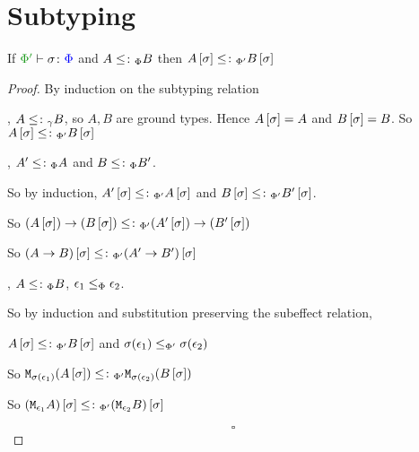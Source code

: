 \documentclass{report}
\begin{document}
\section{Subtyping}

\begin{theorem} 
    If $\typerelation{\P'}{\si}{\P}$ and $A\leq\colon_\Phi B$ then $A\left[\sigma\right]\leq\colon_{\Phi'} B\left[\sigma\right]$    
\end{theorem}
\begin{framed}
    \begin{proof}
        By induction on the subtyping relation
        
        \bi, $A\leq\colon_\gamma B$, so $A, B$ are ground types.
        Hence $A\left[\sigma\right] = A$ and $B\left[\sigma\right] = B$.
        So $A\left[\sigma\right]\leq\colon_{\Phi'} B\left[\sigma\right]$
        
        \bi, $A'\leq\colon_\Phi A$ and $B\leq\colon_\Phi B'$.
        
        So by induction, $A'\left[\sigma\right]\leq\colon_{\Phi'} A\left[\sigma\right]$ and $B\left[\sigma\right]\leq\colon_{\Phi'} B'\left[\sigma\right]$.
        
        So $(A\left[\sigma\right])\rightarrow (B\left[\sigma\right])\leq\colon_{\Phi'} (A'\left[\sigma\right])\rightarrow (B'\left[\sigma\right])$
        
        So $(A\rightarrow B)\left[\sigma\right]\leq\colon_{\Phi'} (A'\rightarrow B')\left[\sigma\right]$
        
        
        \bi, $A\leq\colon_\Phi B$, $\epsilon_1\leq_{\Phi}\epsilon_2$.
        
        So by induction and substitution preserving the subeffect relation, 
        
        $A\left[\sigma\right]\leq\colon_{\Phi'} B\left[\sigma\right]$ and $\sigma(\epsilon_1)\leq_{\Phi'}\sigma(\epsilon_2)$
        
        So $\texttt{M}_{\sigma(\epsilon_1)}{(A\left[\sigma\right])} \leq\colon_{\Phi'}\texttt{M}_{\sigma(\epsilon_2)}{(B\left[\sigma\right])}$
        
        So $(\texttt{M}_{\epsilon_1}{A})\left[\sigma\right] \leq\colon_{\Phi'}(\texttt{M}_{\epsilon_2}{B})\left[\sigma\right]$
        
        $$\square$$
    \end{proof}
    
\end{framed}
\end{document}
